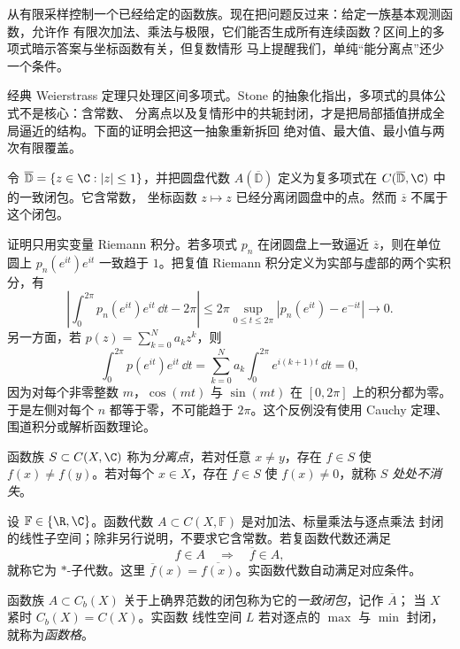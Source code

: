 \ArzelaAscoli{} 从有限采样控制一个已经给定的函数族。现在把问题反过来：给定一族基本观测函数，允许作
有限次加法、乘法与极限，它们能否生成所有连续函数？区间上的多项式暗示答案与坐标函数有关，但复数情形
马上提醒我们，单纯“能分离点”还少一个条件。

经典 Weierstrass 定理只处理区间多项式。Stone 的抽象化指出，多项式的具体公式不是核心：含常数、
分离点以及复情形中的共轭封闭，才是把局部插值拼成全局逼近的结构。下面的证明会把这一抽象重新拆回
绝对值、最大值、最小值与两次有限覆盖。

\begin{example}[缺少共轭的失败]\label{ex:1-3-3-3}
令 $\overline{\mathbb D}=\{z\in\C:|z|\le1\}$，并把圆盘代数
$A(\overline{\mathbb D})$ 定义为复多项式在 $C(\overline{\mathbb D},\C)$ 中的一致闭包。它含常数，
坐标函数 $z\mapsto z$ 已经分离闭圆盘中的点。然而 $\overline z$ 不属于这个闭包。

证明只用实变量 Riemann 积分。若多项式 $p_n$ 在闭圆盘上一致逼近 $\overline z$，则在单位圆上
$p_n(e^{it})e^{it}$ 一致趋于 $1$。把复值 Riemann 积分定义为实部与虚部的两个实积分，有
\[
 \left|\int_0^{2\pi}p_n(e^{it})e^{it}\,\dd t-2\pi\right|
 \le 2\pi\sup_{0\le t\le2\pi}
       |p_n(e^{it})-e^{-it}|\longrightarrow0.
\]
另一方面，若 $p(z)=\sum_{k=0}^Na_kz^k$，则
\[
 \int_0^{2\pi}p(e^{it})e^{it}\,\dd t
 =\sum_{k=0}^Na_k\int_0^{2\pi}e^{i(k+1)t}\,\dd t=0,
\]
因为对每个非零整数 $m$，$\cos(mt)$ 与 $\sin(mt)$ 在 $[0,2\pi]$ 上的积分都为零。于是左侧对每个
$n$ 都等于零，不可能趋于 $2\pi$。这个反例没有使用 Cauchy 定理、围道积分或解析函数理论。
\end{example}

\begin{definition}[分离点与处处不消失]\label{def:1-3-3-1}
函数族 $S\subset C(X,\C)$ 称为\emph{分离点}，若对任意 $x\ne y$，存在 $f\in S$ 使
$f(x)\ne f(y)$。若对每个 $x\in X$，存在 $f\in S$ 使 $f(x)\ne0$，就称 $S$ \emph{处处不消失}。
\end{definition}

\begin{definition}\label{def:1-3-3-2}
设 $\mathbb F\in\{\R,\C\}$。函数代数 $A\subset C(X,\mathbb F)$ 是对加法、标量乘法与逐点乘法
封闭的线性子空间；除非另行说明，不要求它含常数。若复函数代数还满足
\[
  f\in A\quad\Longrightarrow\quad\overline f\in A,
\]
就称它为 $*$-子代数。这里 $\overline f(x)=\overline{f(x)}$。实函数代数自动满足对应条件。
\end{definition}

\begin{definition}[一致闭包与函数格]\label{def:1-3-3-3}
函数族 $A\subset C_b(X)$ 关于上确界范数的闭包称为它的\emph{一致闭包}，记作 $\overline A$；
当 $X$ 紧时 $C_b(X)=C(X)$。实函数
线性空间 $L$ 若对逐点的 $\max$ 与 $\min$ 封闭，就称为\emph{函数格}。
\end{definition}

